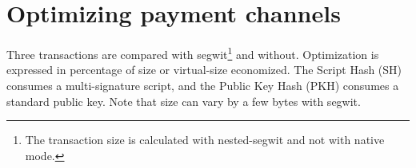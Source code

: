 \section{Optimizing payment channels}


Three transactions are compared with \gls{segwit}\footnote{ The transaction size
is calculated with nested-\gls{segwit} and not with native mode.} and without.
Optimization is expressed in percentage of size or virtual-size economized. The
Script Hash (SH) consumes a multi-signature script, and the Public Key Hash
(PKH) consumes a standard public key. Note that size can vary by a few bytes with
\gls{segwit}.

%

